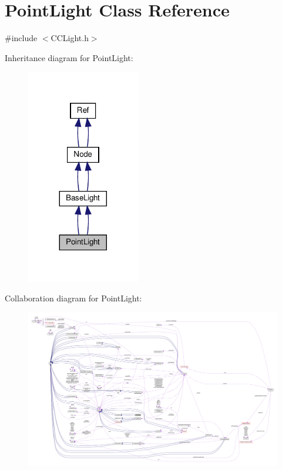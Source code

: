 \hypertarget{classPointLight}{}\section{Point\+Light Class Reference}
\label{classPointLight}


{\ttfamily \#include $<$C\+C\+Light.\+h$>$}



Inheritance diagram for Point\+Light\+:
\nopagebreak
\begin{figure}[H]
\begin{center}
\leavevmode
\includegraphics[width=140pt]{classPointLight__inherit__graph}
\end{center}
\end{figure}


Collaboration diagram for Point\+Light\+:
\nopagebreak
\begin{figure}[H]
\begin{center}
\leavevmode
\includegraphics[width=350pt]{classPointLight__coll__graph}
\end{center}
\end{figure}

